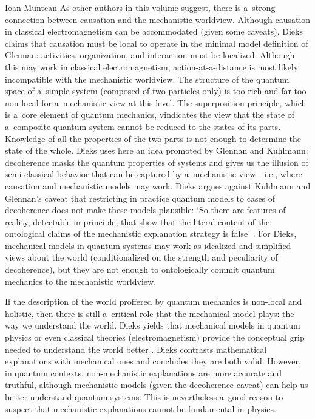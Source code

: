 \begin{recengenv}{Ioan Muntean}
As other authors in this volume suggest, there is a~strong connection between causation and the mechanistic worldview. Although causation in classical electromagnetism can be accommodated (given some caveats), Dieks claims that causation must be local to operate in the minimal model definition of Glennan: activities, organization, and interaction must be localized. Although this may work in classical electromagnetism, action-at-a-distance is most likely incompatible with the mechanistic worldview. The structure of the quantum space of a~simple system (composed of two particles only) is too rich and far too non-local for a~mechanistic view at this level. The superposition principle, which is a~core element of quantum mechanics, vindicates the view that the state of a~composite quantum system cannot be reduced to the states of its parts. Knowledge of all the properties of the two parts is not enough to determine the state of the whole. Dieks uses here an idea promoted by Glennan and Kuhlmann: decoherence masks the quantum properties of systems and gives us the illusion of semi-classical behavior that can be captured by a~mechanistic view---i.e., where causation and mechanistic models may work. Dieks argues against Kuhlmann and Glennan's caveat that restricting in practice quantum models to cases of decoherence does not make these models plausible: ‘So there are features of reality, detectable in principle, that show that the literal content of the ontological claims of the mechanistic explanation strategy is false'
\parencite*[][p.60]{falkenburg_mechanistic_2019}. %
 For Dieks, mechanical models in quantum systems may work as idealized and simplified views about the world (conditionalized on the strength and peculiarity of decoherence), but they are not enough to ontologically commit quantum mechanics to the mechanistic worldview.

If the description of the world proffered by quantum mechanics is non-local and holistic, then there is still a~critical role that the mechanical model plays: the way we understand the world. Dieks yields that mechanical models in quantum physics or even classical theories (electromagnetism) provide the conceptual grip needed to understand the world better
\parencite*[][p.63]{falkenburg_mechanistic_2019}. %
 Dieks contrasts mathematical explanations with mechanical ones and concludes they are both valid. However, in quantum contexts, non-mechanistic explanations are more accurate and truthful, although mechanistic models (given the decoherence caveat) can help us better understand quantum systems. This is nevertheless a~good reason to suspect that mechanistic explanations cannot be fundamental in physics.


\end{recengenv}
